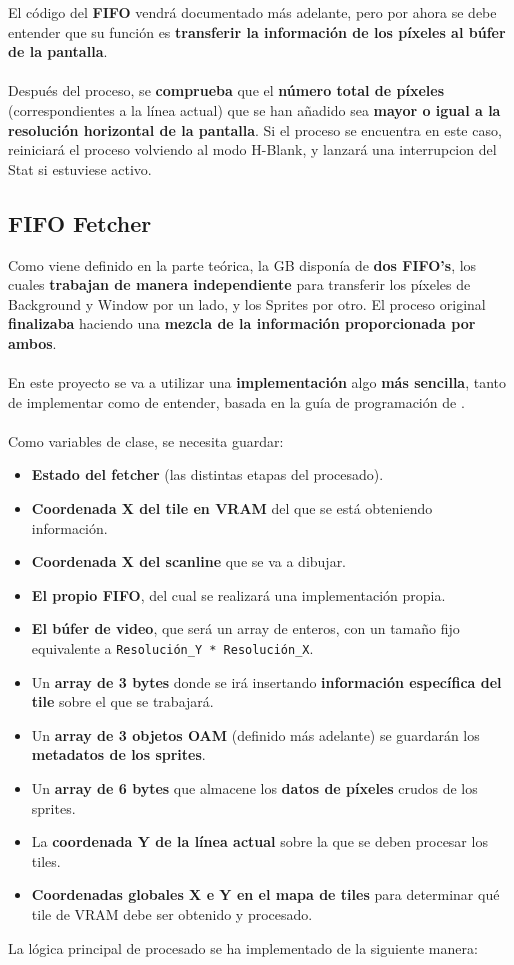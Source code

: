 El código del \textbf{FIFO} vendrá documentado más adelante, pero por ahora se debe entender que su función es \textbf{transferir la información de los píxeles al búfer de la pantalla}. 
\\\\
Después del proceso, se \textbf{comprueba} que el \textbf{número total de píxeles} (correspondientes a la línea actual) que se han añadido sea \textbf{mayor o igual a la resolución horizontal de la pantalla}. Si el proceso se encuentra en este caso, reiniciará el proceso volviendo al modo H-Blank, y lanzará una interrupcion del Stat si estuviese activo.

\subsection{FIFO Fetcher}

Como viene definido en la parte teórica, la GB disponía de \textbf{dos FIFO's}, los cuales \textbf{trabajan de manera independiente} para transferir los píxeles de Background y Window por un lado, y los Sprites por otro. El proceso original \textbf{finalizaba} haciendo una \textbf{mezcla de la información proporcionada por ambos}.
\\\\
En este proyecto se va a utilizar una \textbf{implementación} algo \textbf{más sencilla}, tanto de implementar como de entender, basada en la guía de programación de \cite{lld}.
\\\\
Como variables de clase, se necesita guardar:

\begin{itemize} 
    \item \textbf{Estado del fetcher} (las distintas etapas del procesado).
    \item \textbf{Coordenada X del tile en VRAM} del que se está obteniendo información.
    \item \textbf{Coordenada X del scanline} que se va a dibujar.
    \item \textbf{El propio FIFO}, del cual se realizará una implementación propia.
    \item \textbf{El búfer de video}, que será un array de enteros, con un tamaño fijo equivalente a \texttt{Resolución\_Y * Resolución\_X}.
    \item Un \textbf{array de 3 bytes} donde se irá insertando \textbf{información específica del tile} sobre el que se trabajará.
    \item Un \textbf{array de 3 objetos OAM} (definido más adelante) se guardarán los \textbf{metadatos de los sprites}.
    \item Un \textbf{array de 6 bytes} que almacene los \textbf{datos de píxeles} crudos de los sprites.
    \item La \textbf{coordenada Y de la línea actual} sobre la que se deben procesar los tiles.
    \item \textbf{Coordenadas globales X e Y en el mapa de tiles} para determinar qué tile de VRAM debe ser obtenido y procesado.
\end{itemize}
\clearpage
La lógica principal de procesado se ha implementado de la siguiente manera:

